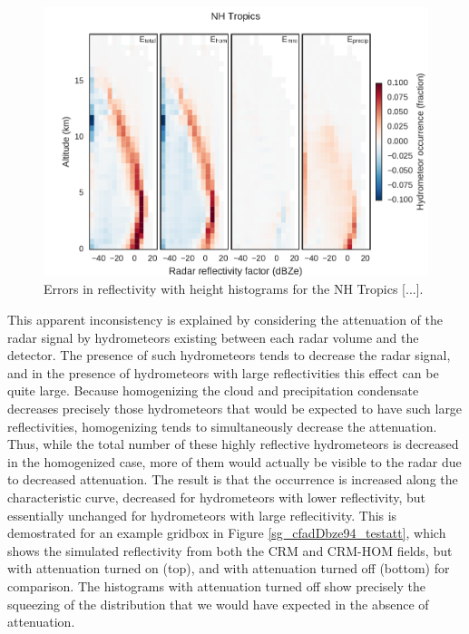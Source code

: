 \begin{figure}
\centering
\includegraphics[width=\columnwidth]{graphics/subgrid1_cfadDbze94_NHTropics_diff.pdf}
\caption{Errors in reflectivity with height histograms for the NH Tropics [...].}
\label{sg_cfadDbze94_tropics_diff}
\end{figure}

This apparent inconsistency is explained by considering the attenuation of the radar signal by hydrometeors existing between each radar volume and the detector. The presence of such hydrometeors tends to decrease the radar signal, and in the presence of hydrometeors with large reflectivities this effect can be quite large. Because homogenizing the cloud and precipitation condensate decreases precisely those hydrometeors that would be expected to have such large reflectivities, homogenizing tends to simultaneously decrease the attenuation. Thus, while the total number of these highly reflective hydrometeors is decreased in the homogenized case, more of them would actually be visible to the radar due to decreased attenuation. The result is that the occurrence is increased along the characteristic curve, decreased for hydrometeors with lower reflectivity, but essentially unchanged for hydrometeors with large reflecitivity. This is demostrated for an example gridbox in Figure \ref{sg_cfadDbze94_testatt}, which shows the simulated reflectivity from both the CRM and CRM-HOM fields, but with attenuation turned on (top), and with attenuation turned off (bottom) for comparison. The histograms with attenuation turned off show precisely the squeezing of the distribution that we would have expected in the absence of attenuation.

